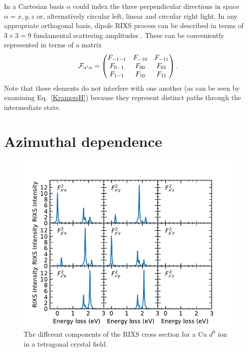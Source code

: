 \documentclass[aps,onecolumn, notitlepage, longbibliography]{revtex4-1}
\begin{document}
In a Cartesian basis $\alpha$ could index the three perpendicular directions in space $\alpha=x,y,z$ or, alternatively circular left, linear and circular right light. In any appropriate orthogonal basis, dipole RIXS process can be described in terms of $3\times3=9$ fundamental scattering amplitudes \cite{Ament2011}. These can be conveniently represented in terms of a matrix 
\begin{equation}
 {\cal F}_{\alpha^\prime\alpha} =
  \begin{pmatrix}
    F_{-1-1} & F_{-10}  & F_{-11}  \\
    F_{0-1} & F_{00}  & F_{01}  \\
   F_{1-1} & F_{10}  & F_{11}
  \end{pmatrix} .
\end{equation}
Note that these elements do not interfere with one another (as can be seen by examining Eq.~\ref{KramersH}) because they represent distinct paths through the intermediate state.

\section{Azimuthal dependence}
\begin{figure}
    \includegraphics{Figs/Cu_RIXS.pdf}
    \caption{The different components of the RIXS cross section for a Cu $d^9$ ion in a tetragonal crystal field.}
    \label{Cu_RIXS_spectra}
\end{figure}
\end{document}

